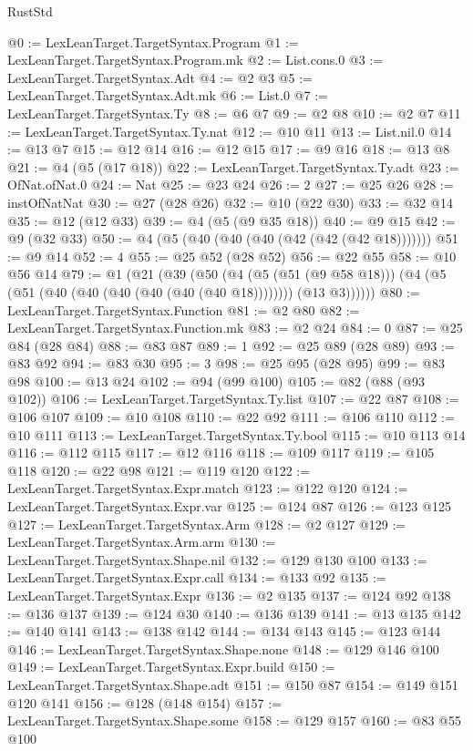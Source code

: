 \begin{lexlean}{RustStd}
\begin{coremodule}
@0 := LexLeanTarget.TargetSyntax.Program
@1 := LexLeanTarget.TargetSyntax.Program.mk
@2 := List.cons.{0}
@3 := LexLeanTarget.TargetSyntax.Adt
@4 := @2 @3
@5 := LexLeanTarget.TargetSyntax.Adt.mk
@6 := List.{0}
@7 := LexLeanTarget.TargetSyntax.Ty
@8 := @6 @7
@9 := @2 @8
@10 := @2 @7
@11 := LexLeanTarget.TargetSyntax.Ty.nat
@12 := @10 @11
@13 := List.nil.{0}
@14 := @13 @7
@15 := @12 @14
@16 := @12 @15
@17 := @9 @16
@18 := @13 @8
@21 := @4 (@5 (@17 @18))
@22 := LexLeanTarget.TargetSyntax.Ty.adt
@23 := OfNat.ofNat.{0}
@24 := Nat
@25 := @23 @24
@26 := 2
@27 := @25 @26
@28 := instOfNatNat
@30 := @27 (@28 @26)
@32 := @10 (@22 @30)
@33 := @32 @14
@35 := @12 (@12 @33)
@39 := @4 (@5 (@9 @35 @18))
@40 := @9 @15
@42 := @9 (@32 @33)
@50 := @4 (@5 (@40 (@40 (@40 (@42 (@42 (@42 @18)))))))
@51 := @9 @14
@52 := 4
@55 := @25 @52 (@28 @52)
@56 := @22 @55
@58 := @10 @56 @14
@79 := @1
    (@21
      (@39
        (@50
          (@4
            (@5 (@51 (@9 @58 @18)))
            (@4 (@5 (@51 (@40 (@40 (@40 (@40 (@40 (@40 @18)))))))) (@13 @3))))))
@80 := LexLeanTarget.TargetSyntax.Function
@81 := @2 @80
@82 := LexLeanTarget.TargetSyntax.Function.mk
@83 := @2 @24
@84 := 0
@87 := @25 @84 (@28 @84)
@88 := @83 @87
@89 := 1
@92 := @25 @89 (@28 @89)
@93 := @83 @92
@94 := @83 @30
@95 := 3
@98 := @25 @95 (@28 @95)
@99 := @83 @98
@100 := @13 @24
@102 := @94 (@99 @100)
@105 := @82 (@88 (@93 @102))
@106 := LexLeanTarget.TargetSyntax.Ty.list
@107 := @22 @87
@108 := @106 @107
@109 := @10 @108
@110 := @22 @92
@111 := @106 @110
@112 := @10 @111
@113 := LexLeanTarget.TargetSyntax.Ty.bool
@115 := @10 @113 @14
@116 := @112 @115
@117 := @12 @116
@118 := @109 @117
@119 := @105 @118
@120 := @22 @98
@121 := @119 @120
@122 := LexLeanTarget.TargetSyntax.Expr.match
@123 := @122 @120
@124 := LexLeanTarget.TargetSyntax.Expr.var
@125 := @124 @87
@126 := @123 @125
@127 := LexLeanTarget.TargetSyntax.Arm
@128 := @2 @127
@129 := LexLeanTarget.TargetSyntax.Arm.arm
@130 := LexLeanTarget.TargetSyntax.Shape.nil
@132 := @129 @130 @100
@133 := LexLeanTarget.TargetSyntax.Expr.call
@134 := @133 @92
@135 := LexLeanTarget.TargetSyntax.Expr
@136 := @2 @135
@137 := @124 @92
@138 := @136 @137
@139 := @124 @30
@140 := @136 @139
@141 := @13 @135
@142 := @140 @141
@143 := @138 @142
@144 := @134 @143
@145 := @123 @144
@146 := LexLeanTarget.TargetSyntax.Shape.none
@148 := @129 @146 @100
@149 := LexLeanTarget.TargetSyntax.Expr.build
@150 := LexLeanTarget.TargetSyntax.Shape.adt
@151 := @150 @87
@154 := @149 @151 @120 @141
@156 := @128 (@148 @154)
@157 := LexLeanTarget.TargetSyntax.Shape.some
@158 := @129 @157
@160 := @83 @55 @100

\end{coremodule}
\end{lexlean}
